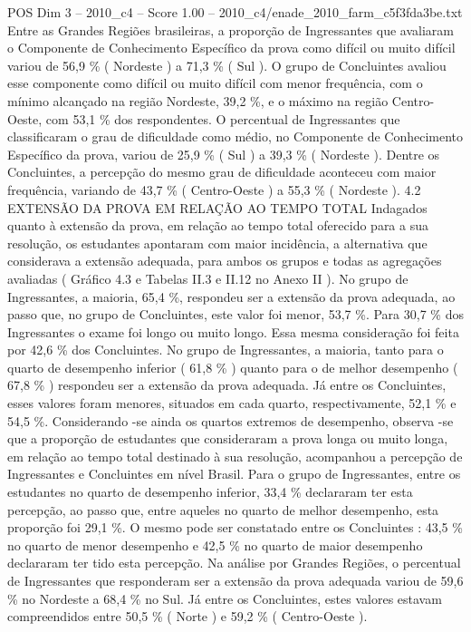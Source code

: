 \begin{textsample}{POS Dim 3 – 2010\_c4 – Score 1.00 – 2010\_c4/enade\_2010\_farm\_c5f3fda3be.txt}
Entre as Grandes Regiões brasileiras, a proporção de Ingressantes que avaliaram o Componente de Conhecimento Específico da prova como difícil ou muito difícil variou de 56,9 \% ( Nordeste ) a 71,3 \% ( Sul ).
O grupo de Concluintes avaliou esse componente como difícil ou muito difícil com menor frequência, com o mínimo alcançado na região Nordeste, 39,2 \%, e o máximo na região Centro-Oeste, com 53,1 \% dos respondentes.
O percentual de Ingressantes que classificaram o grau de dificuldade como médio, no Componente de Conhecimento Específico da prova, variou de 25,9 \% ( Sul ) a 39,3 \% ( Nordeste ).
Dentre os Concluintes, a percepção do mesmo grau de dificuldade aconteceu com maior frequência, variando de 43,7 \% ( Centro-Oeste ) a 55,3 \% ( Nordeste ). 4.2 EXTENSÃO DA PROVA EM RELAÇÃO AO TEMPO TOTAL Indagados quanto à extensão da prova, em relação ao tempo total oferecido para a sua resolução, os estudantes apontaram com maior incidência, a alternativa que considerava a extensão adequada, para ambos os grupos e todas as agregações avaliadas ( Gráfico 4.3 e Tabelas II.3 e II.12 no Anexo II ).
No grupo de Ingressantes, a maioria, 65,4 \%, respondeu ser a extensão da prova adequada, ao passo que, no grupo de Concluintes, este valor foi menor, 53,7 \%.
Para 30,7 \% dos Ingressantes o exame foi longo ou muito longo.
Essa mesma consideração foi feita por 42,6 \% dos Concluintes.
No grupo de Ingressantes, a maioria, tanto para o quarto de desempenho inferior ( 61,8 \% ) quanto para o de melhor desempenho ( 67,8 \% ) respondeu ser a extensão da prova adequada.
Já entre os Concluintes, esses valores foram menores, situados em cada quarto, respectivamente, 52,1 \% e 54,5 \%.
Considerando -se ainda os quartos extremos de desempenho, observa -se que a proporção de estudantes que consideraram a prova longa ou muito longa, em relação ao tempo total destinado à sua resolução, acompanhou a percepção de Ingressantes e Concluintes em nível Brasil.
Para o grupo de Ingressantes, entre os estudantes no quarto de desempenho inferior, 33,4 \% declararam ter esta percepção, ao passo que, entre aqueles no quarto de melhor desempenho, esta proporção foi 29,1 \%.
O mesmo pode ser constatado entre os Concluintes : 43,5 \% no quarto de menor desempenho e 42,5 \% no quarto de maior desempenho declararam ter tido esta percepção.
Na análise por Grandes Regiões, o percentual de Ingressantes que responderam ser a extensão da prova adequada variou de 59,6 \% no Nordeste a 68,4 \% no Sul.
Já entre os Concluintes, estes valores estavam compreendidos entre 50,5 \% ( Norte ) e 59,2 \% ( Centro-Oeste ).

\end{textsample}
